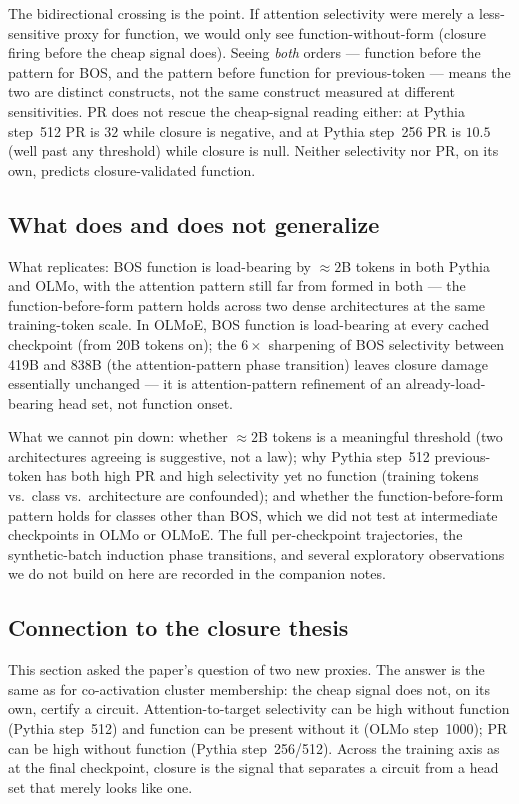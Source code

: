 \documentclass[11pt]{article}
\begin{document}
The bidirectional crossing is the point. If attention selectivity were
merely a less-sensitive proxy for function, we would only see
function-without-form (closure firing before the cheap signal does).
Seeing \emph{both} orders --- function before the pattern for BOS, and the
pattern before function for previous-token --- means the two are distinct
constructs, not the same construct measured at different sensitivities. PR
does not rescue the cheap-signal reading either: at Pythia step~512 PR is
$32$ while closure is negative, and at Pythia step~256 PR is $10.5$ (well
past any threshold) while closure is null. Neither selectivity nor PR, on
its own, predicts closure-validated function.

\subsection{What does and does not generalize}

What replicates: BOS function is load-bearing by $\approx 2$B tokens in
both Pythia and OLMo, with the attention pattern still far from formed in
both --- the function-before-form pattern holds across two dense
architectures at the same training-token scale. In OLMoE, BOS function is
load-bearing at every cached checkpoint (from 20B tokens on); the
$6\times$ sharpening of BOS selectivity between 419B and 838B (the
attention-pattern phase transition) leaves closure damage essentially
unchanged --- it is attention-pattern refinement of an already-load-bearing
head set, not function onset.

What we cannot pin down: whether $\approx 2$B tokens is a meaningful
threshold (two architectures agreeing is suggestive, not a law); why
Pythia step~512 previous-token has both high PR and high selectivity yet
no function (training tokens vs.\ class vs.\ architecture are confounded);
and whether the function-before-form pattern holds for classes other than
BOS, which we did not test at intermediate checkpoints in OLMo or OLMoE.
The full per-checkpoint trajectories, the synthetic-batch induction
phase transitions, and several exploratory observations we do not build
on here are recorded in the companion notes.

\subsection{Connection to the closure thesis}

This section asked the paper's question of two new proxies. The answer is
the same as for co-activation cluster membership: the cheap signal does
not, on its own, certify a circuit. Attention-to-target selectivity can be
high without function (Pythia step~512) and function can be present without
it (OLMo step~1000); PR can be high without function (Pythia step~256/512).
Across the training axis as at the final checkpoint, closure is the signal
that separates a circuit from a head set that merely looks like one.
\end{document}
